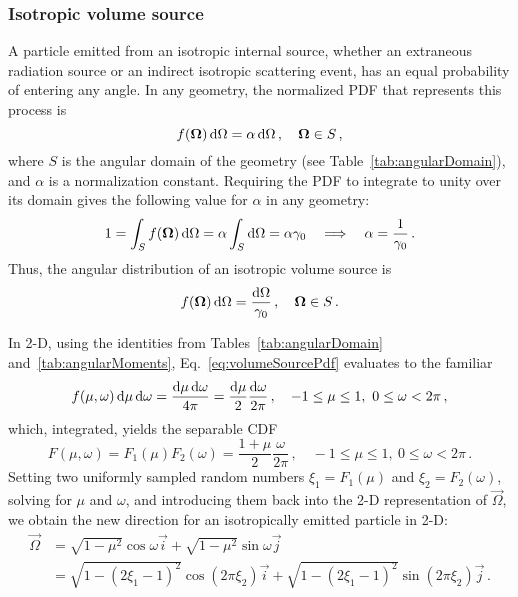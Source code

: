 \subsubsection{Isotropic volume source}
A particle emitted from an isotropic internal source, whether an extraneous
radiation source or an indirect isotropic scattering event, has an equal
probability of entering any angle. In any geometry, the normalized PDF that
represents this process is
\begin{equation*}
  f(\bm{\Omega}) \mathop{}\!\mathrm{d}\Omega = \alpha \mathop{}\!\mathrm{d}\Omega \,,
  \quad \bm{\Omega} \in S \,,
\end{equation*}
where $S$ is the angular domain of the
geometry (see Table~\ref{tab:angularDomain}), and $\alpha$ is a normalization
constant.
Requiring the PDF to integrate to unity over its domain gives the
following value for $\alpha$ in any geometry:
\begin{align*}
  1 = \int_{S} f(\bm{\Omega}) \mathop{}\!\mathrm{d}\Omega
  = \alpha \int_{S} \mathop{}\!\mathrm{d}\Omega = \alpha \gamma_0
  \quad \Longrightarrow \quad
  \alpha = \frac{1}{\gamma_0}\,.
\end{align*}
Thus, the angular distribution of an isotropic volume source is
\begin{equation}\label{eq:volumeSourcePdf}
  f(\bm{\Omega}) \mathop{}\!\mathrm{d}\Omega = \frac{\mathop{}\!\mathrm{d}\Omega}{\gamma_0} \,,
  \quad \bm{\Omega} \in S\,.
\end{equation}

In 2-D, using the identities from Tables~\ref{tab:angularDomain}
and~\ref{tab:angularMoments}, Eq.~\eqref{eq:volumeSourcePdf} evaluates to the
familiar
\begin{equation*}
  f(\mu,\omega) \mathop{}\!\mathrm{d}\mu\mathop{}\!\mathrm{d}\omega = \frac{\mathop{}\!\mathrm{d}\mu\mathop{}\!\mathrm{d}\omega}{4\pi} 
  = \frac{\mathop{}\!\mathrm{d}\mu}{2}\frac{\mathop{}\!\mathrm{d}\omega}{2\pi}
  \,,
  \quad -1\le \mu \le 1,\ 0 \le \omega < 2\pi\,,
\end{equation*}
which, integrated, yields the separable CDF
\begin{equation*}
  F(\mu,\omega) = F_1(\mu) F_2(\omega)
  = \frac{1 + \mu}{2}\frac{\omega}{2\pi}\,,
  \quad -1\le \mu \le 1,\ 0 \le \omega < 2\pi\,.
\end{equation*}
Setting two uniformly sampled random numbers $\xi_1 = F_1(\mu)$ and
$\xi_2 = F_2(\omega)$, solving for $\mu$ and $\omega$, and
introducing them back into the 2-D representation of $\vec{\Omega}$, we obtain the
new direction for an isotropically emitted particle in 2-D:
\begin{align*}
  \vec{\Omega} &= \sqrt{1-\mu^2} \cos \omega \vec{i}
  + \sqrt{1-\mu^2} \sin \omega \vec{j}
\\
  &= \sqrt{1-(2\xi_1-1)^2} \cos(2\pi\xi_2) \vec{i}
  + \sqrt{1-(2\xi_1-1)^2} \sin(2\pi\xi_2) \vec{j}\,.
\end{align*}


